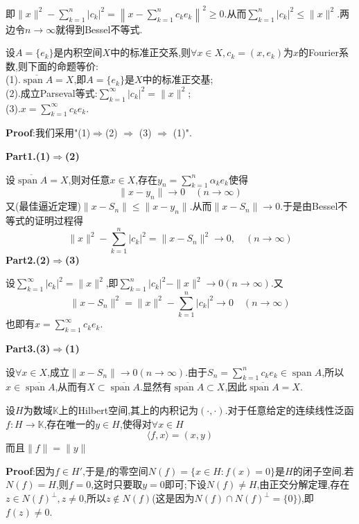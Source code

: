 即$\|x\|^2-\sum_{k=1}^{n}|c_k|^2=\left\|x-\sum_{k=1}^{n}c_ke_k\right\|^2\geqslant 0$.从而$\sum_{k=1}^{n}|c_k|^2\leqslant \|x\|^2$.两边令$n\to\infty$就得到Bessel不等式.\par
\begin{tcolorbox}[colback=KuangNei,colframe=BianKuang,title=\textbf{Parseval等式},sharpish corners]
    设$A=\{e_k\}$是内积空间$X$中的标准正交系,则$\forall x\in X,c_k=(x,e_k)$为$x$的Fourier系数,则下面的命题等价:\\
    (1).$\overline{\operatorname{span}A}=X$,即$A=\{e_k\}$是$X$中的标准正交基;\\
    (2).成立Parseval等式:$\sum_{k=1}^{\infty}|c_k|^2=\|x\|^2$;\\
    (3).$x=\sum_{k=1}^{\infty}c_ke_k$.
\end{tcolorbox}
\textbf{Proof}:我们采用"(1)$\Rightarrow $(2) $\Rightarrow$ (3) $\Rightarrow$ (1)".\par
\textbf{Part1.(1)$\Rightarrow $(2)}\par
设$\overline{\operatorname{span}A}=X$,则对任意$x\in X$,存在$y_n=\sum_{k=1}^{n}\alpha_ke_k$使得
$$
\|x-y_n\|\to 0\quad (n\to\infty)
$$
又(最佳逼近定理)$\|x-S_n\|\leqslant \|x-y_n\|$.从而$\|x-S_n\|\to 0$.于是由Bessel不等式的证明过程得
$$
\|x\|^2-\sum_{k=1}^{n}|c_k|^2=\|x-S_n\|^2\to 0,\quad (n\to\infty)
$$
\qquad \textbf{Part2.(2)$\Rightarrow $(3)}\par
设$\sum_{k=1}^{\infty}|c_k|^2=\|x\|^2$,即$\sum_{k=1}^{n}|c_k|^2-\|x\|^2\to 0(n\to \infty)$.又
$$
\|x-S_n\|^2=\|x\|^2-\sum_{k=1}^{n}|c_k|^2\to 0\quad (n\to\infty)
$$
也即有$x=\sum_{k=1}^{\infty}c_ke_k$.\par
\textbf{Part3.(3)$\Rightarrow $(1)}\par
设$\forall x\in X$,成立$\|x-S_n\|\to 0(n\to\infty)$.由于$S_n=\sum_{k=1}^{n}c_ke_k\in \operatorname{span}A$,所以$x\in \overline{\operatorname{span}A}$,从而有$X\subset \overline{\operatorname{span}A}$.显然有$\overline{\operatorname{span}A}\subset X$,因此$\overline{\operatorname{span}A}=X$.\par
\begin{tcolorbox}[colback=KuangNei,colframe=BianKuang,title=\textbf{Riesz表示定理},sharpish corners]
    设$H$为数域$\mathbb{K}$上的Hilbert空间,其上的内积记为$(\cdot,\cdot)$.对于任意给定的连续线性泛函$f:H\to\mathbb{K}$,存在唯一的$y\in H$,使得对$\forall x\in H$
    $$
    \langle f,x\rangle=(x,y)
    $$
    而且$\|f\|=\|y\|$
\end{tcolorbox}
\textbf{Proof}:因为$f\in H'$,于是$f$的零空间$N(f)=\{x\in H:f(x)=0\}$是$H$的闭子空间.若$N(f)=H$,则$f=0$,这时只要取$y=0$即可;下设$N(f)\neq H$,由正交分解定理,存在$z\in N(f)^{\perp },z\neq 0$,所以$z\notin N(f)$(这是因为$N(f)\cap N(f)^{\perp}=\{0\}$),即$f(z)\neq 0$.\par
